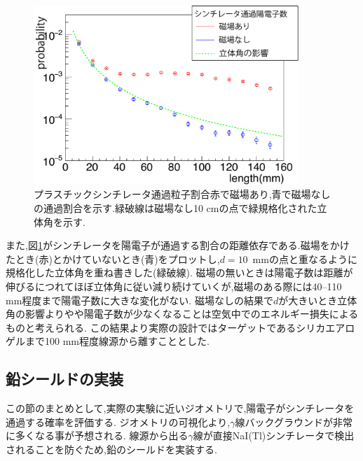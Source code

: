\begin{figure}[!tbp]
	\centering
	\includegraphics[width=10cm]{fig/scinti_test.pdf}
	\caption[プラスチックシンチレータ通過粒子割合]{プラスチックシンチレータ通過粒子割合\newline 赤で磁場あり,青で磁場なしの通過割合を示す.緑破線は磁場なし10 cmの点で緑規格化された立体角を示す.}
	\label{scinti_test}
\end{figure}


また,図\ref{scinti_test}がシンチレータを陽電子が通過する割合の距離依存である.磁場をかけたとき(赤)とかけていないとき(青)をプロットし,$d=10$\, mmの点と重なるように規格化した立体角を重ね書きした(緑破線).
磁場の無いときは陽電子数は距離が伸びるにつれてほぼ立体角に従い減り続けていくが,磁場のある際には40--110 mm程度まで陽電子数に大きな変化がない.
磁場なしの結果で$d$が大きいとき立体角の影響よりやや陽電子数が少なくなることは空気中でのエネルギー損失によるものと考えられる.
この結果より実際の設計ではターゲットであるシリカエアロゲルまで100 mm程度線源から離すこととした.

\subsection{鉛シールドの実装}
この節のまとめとして,実際の実験に近いジオメトリで,陽電子がシンチレータを通過する確率を評価する.
ジオメトリの可視化より,$\gamma$線バックグラウンドが非常に多くなる事が予想される.
線源から出る$\gamma$線が直接NaI(Tl)シンチレータで検出されることを防ぐため,鉛のシールドを実装する.

